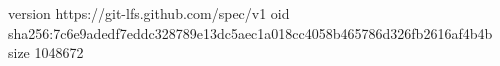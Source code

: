 version https://git-lfs.github.com/spec/v1
oid sha256:7c6e9adedf7eddc328789e13dc5aec1a018cc4058b465786d326fb2616af4b4b
size 1048672
